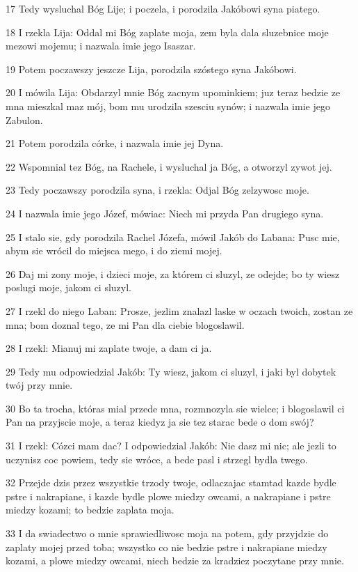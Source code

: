 \par 17 Tedy wysluchal Bóg Lije; i poczela, i porodzila Jakóbowi syna piatego.
\par 18 I rzekla Lija: Oddal mi Bóg zaplate moja, zem byla dala sluzebnice moje mezowi mojemu; i nazwala imie jego Isaszar.
\par 19 Potem poczawszy jeszcze Lija, porodzila szóstego syna Jakóbowi.
\par 20 I mówila Lija: Obdarzyl mnie Bóg zacnym upominkiem; juz teraz bedzie ze mna mieszkal maz mój, bom mu urodzila szesciu synów; i nazwala imie jego Zabulon.
\par 21 Potem porodzila córke, i nazwala imie jej Dyna.
\par 22 Wspomnial tez Bóg, na Rachele, i wysluchal ja Bóg, a otworzyl zywot jej.
\par 23 Tedy poczawszy porodzila syna, i rzekla: Odjal Bóg zelzywosc moje.
\par 24 I nazwala imie jego Józef, mówiac: Niech mi przyda Pan drugiego syna.
\par 25 I stalo sie, gdy porodzila Rachel Józefa, mówil Jakób do Labana: Pusc mie, abym sie wrócil do miejsca mego, i do ziemi mojej.
\par 26 Daj mi zony moje, i dzieci moje, za którem ci sluzyl, ze odejde; bo ty wiesz poslugi moje, jakom ci sluzyl.
\par 27 I rzekl do niego Laban: Prosze, jezlim znalazl laske w oczach twoich, zostan ze mna; bom doznal tego, ze mi Pan dla ciebie blogoslawil.
\par 28 I rzekl: Mianuj mi zaplate twoje, a dam ci ja.
\par 29 Tedy mu odpowiedzial Jakób: Ty wiesz, jakom ci sluzyl, i jaki byl dobytek twój przy mnie.
\par 30 Bo ta trocha, któras mial przede mna, rozmnozyla sie wielce; i blogoslawil ci Pan na przyjscie moje, a teraz kiedyz ja sie tez starac bede o dom swój?
\par 31 I rzekl: Cózci mam dac? I odpowiedzial Jakób: Nie dasz mi nic; ale jezli to uczynisz coc powiem, tedy sie wróce, a bede pasl i strzegl bydla twego.
\par 32 Przejde dzis przez wszystkie trzody twoje, odlaczajac stamtad kazde bydle pstre i nakrapiane, i kazde bydle plowe miedzy owcami, a nakrapiane i pstre miedzy kozami; to bedzie zaplata moja.
\par 33 I da swiadectwo o mnie sprawiedliwosc moja na potem, gdy przyjdzie do zaplaty mojej przed toba; wszystko co nie bedzie pstre i nakrapiane miedzy kozami, a plowe miedzy owcami, niech bedzie za kradziez poczytane przy mnie.
